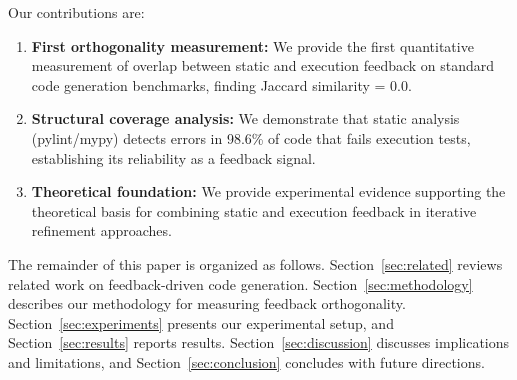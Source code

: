 Our contributions are:
\begin{enumerate}
    \item \textbf{First orthogonality measurement:} We provide the first quantitative measurement of overlap between static and execution feedback on standard code generation benchmarks, finding Jaccard similarity = 0.0.
    \item \textbf{Structural coverage analysis:} We demonstrate that static analysis (pylint/mypy) detects errors in 98.6\% of code that fails execution tests, establishing its reliability as a feedback signal.
    \item \textbf{Theoretical foundation:} We provide experimental evidence supporting the theoretical basis for combining static and execution feedback in iterative refinement approaches.
\end{enumerate}

The remainder of this paper is organized as follows. Section~\ref{sec:related} reviews related work on feedback-driven code generation. Section~\ref{sec:methodology} describes our methodology for measuring feedback orthogonality. Section~\ref{sec:experiments} presents our experimental setup, and Section~\ref{sec:results} reports results. Section~\ref{sec:discussion} discusses implications and limitations, and Section~\ref{sec:conclusion} concludes with future directions.
